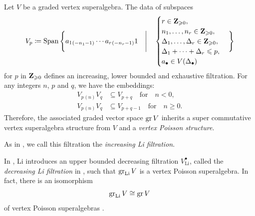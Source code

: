 \begin{theorem} \label{theorem:li-filtration}
	Let $V$ be a graded vertex superalgebra. The data of subspaces
	\[ V_p \coloneqq \operatorname{Span} \Bigg\{ a_1{}_{(-n_1 - 1)} \cdots a_r{}_{(-n_r - 1)} 1 \quad \Bigg| \quad \begin{cases}
		r \in \mathbf{Z}_{\geqslant 0}, \\
		n_1, \dots, n_r \in \mathbf{Z}_{\geqslant 0}, \\
		\Delta_1, \dots, \Delta_r \in \mathbf{Z}_{\geqslant 0}, \\
		\Delta_1 + \cdots + \Delta_r \leqslant p, \\
		a_\bullet \in V(\Delta_\bullet)
	\end{cases} \Bigg\} \]
	for $p$ in $\mathbf{Z}_{\geqslant 0}$ defines an increasing, lower bounded and exhaustive filtration. For any integers $n$, $p$ and $q$, we have the embeddings:
	\begin{equation} \label{equation:li-filtration-property} \begin{aligned}
		V_p{}_{(n)} V_q & \subseteq V_{p + q} \quad \text{for} \quad n < 0, \\
		V_p{}_{(n)} V_q & \subseteq V_{p + q - 1} \quad \text{for} \quad n \geqslant 0.
	\end{aligned} \end{equation}
	Therefore, the associated graded vector space $\operatorname{gr} V$ inherits a super commutative vertex superalgebra structure from $V$ and a \emph{vertex Poisson structure}.
\end{theorem}

As in \cite{arakawa2026faithful}, we call this filtration the \emph{increasing Li filtration}. 


\begin{remark}
	In \cite[Definition 2.7 and Theorem 2.12]{li2005abelianizing}, Li introduces an upper bounded decreasing filtration $V_{\mathrm{Li}}^\bullet$, called the \emph{decreasing Li filtration} in \cite{arakawa2026faithful}, such that $\operatorname{gr}_{\mathrm{Li}} V$ is a vertex Poisson superalgebra. In fact, there is an isomorphism
	\[ \operatorname{gr}_{\mathrm{Li}} V \cong \operatorname{gr} V \]
	of vertex Poisson superalgebras \cite[Proposition 2.6.1]{arakawa2012remark}.
\end{remark}


